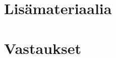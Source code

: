 \liitetyyli

	









\section{Lisämateriaalia}



% 

%


\newpage
\section{Vastaukset}
\begin{vastaussivu}

\end{vastaussivu}
